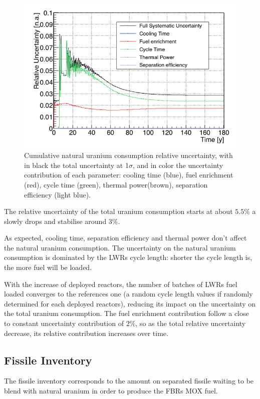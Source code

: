 \documentclass{anstrans}
\begin{document}
\begin{figure}[h!!] %
    \centering
    \includegraphics[scale=0.35]{unat_uncer}
    \caption{Cumulative natural uranium consumption relative uncertainty, with
    in black the total uncertainty at 1$\sigma$, and in color the uncertainty
    contribution of each parameter: cooling time (blue), fuel enrichment (red),
    cycle time (green), thermal power(brown), separation efficiency (light
    blue).}\label{fig:unatr_uncer}
\end{figure}
The relative uncertainty of the total uranium consumption starts at about
$5.5\%$ a slowly drops and stabilise around $3\%$.

As expected, cooling time, separation efficiency and thermal power don't
affect the natural uranium consumption.  The uncertainty on the natural uranium
consumption is dominated by the \glspl{LWR} cycle length: shorter the cycle
length is, the more fuel will be loaded.

With the increase of deployed reactors, the number of batches of \glspl{LWR}
fuel loaded converges to the references one (a random cycle length
values if randomly determined for each deployed reactors), reducing its impact
on the uncertainty on the total uranium consumption.
The fuel enrichment contribution follow a close to constant uncertainty
contribution of $2\%$, so as the total relative uncertainty decrease, its
relative contribution increases over time.

\subsection{Fissile Inventory}
The fissile inventory corresponds to the amount on separated fissile waiting to
be blend with natural uranium in order to produce the \glspl{FBR} MOX fuel.
\end{document}
